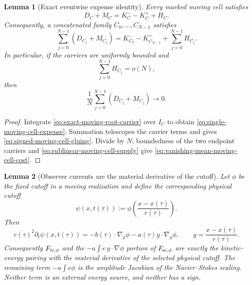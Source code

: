 \documentclass[11pt]{amsart}
\numberwithin{equation}{section}
\theoremstyle{plain}
\newtheorem{lemma}[lemma]{Lemma}
\theoremstyle{definition}
\theoremstyle{remark}
\begin{document}
\begin{lemma}[Exact eventwise expense identity]
\label{lem:signed-moving-cell-gluing}
Every marked moving cell satisfies
\begin{equation}\label{eq:single-moving-cell-expense}
 D_C+M_C=K_C^--K_C^++H_C.
\end{equation}
Consequently, a concatenated family \(C_0,\ldots,C_{N-1}\) satisfies
\begin{equation}\label{eq:signed-moving-cell-gluing}
 \sum_{j=0}^{N-1}(D_{C_j}+M_{C_j})
 =K_{C_0}^--K_{C_{N-1}}^++\sum_{j=0}^{N-1}H_{C_j}.
\end{equation}
In particular, if the carriers are uniformly bounded and
\begin{equation}\label{eq:sublinear-moving-cell-supply}
 \sum_{j=0}^{N-1}H_{C_j}=o(N),
\end{equation}
then
\begin{equation}\label{eq:vanishing-mean-moving-cell-cost}
 \frac1N\sum_{j=0}^{N-1}(D_{C_j}+M_{C_j})\longrightarrow0.
\end{equation}
\end{lemma}

\begin{proof}
Integrate \eqref{eq:exact-moving-root-carrier} over \(I_C\) to obtain
\eqref{eq:single-moving-cell-expense}.  Summation telescopes the carrier terms
and gives \eqref{eq:signed-moving-cell-gluing}.  Divide by \(N\); boundedness
of the two endpoint carriers and \eqref{eq:sublinear-moving-cell-supply} give
\eqref{eq:vanishing-mean-moving-cell-cost}.
\end{proof}

\begin{lemma}[Observer currents are the material derivative of the cutoff]
\label{lem:observer-current-material-cutoff}
Let \(\phi\) be the fixed cutoff in a moving realization and define the
corresponding physical cutoff
\[
 \psi(x,t(\tau))
 :=\phi\!\left(\frac{x-x(\tau)}{r(\tau)}\right).
\]
Then
\begin{equation}\label{eq:material-cutoff-derivative}
 r(\tau)^2\partial_t\psi(x,t(\tau))
 =-b(\tau)\cdot\nabla_y\phi-a(\tau)y\cdot\nabla_y\phi,
 \qquad y=\frac{x-x(\tau)}{r(\tau)}.
\end{equation}
Consequently \(F_{\rm tr,\phi}\) and the
\(-a\int e\,y\cdot\nabla\phi\) portion of \(F_{\rm sc,\phi}\) are exactly
the kinetic-energy pairing with the material derivative of the selected
physical cutoff.  The remaining term \(-a\int e\phi\) is the amplitude
Jacobian of the Navier--Stokes scaling.  Neither term is an external energy
source, and neither has a sign.
\end{lemma}
\end{document}
